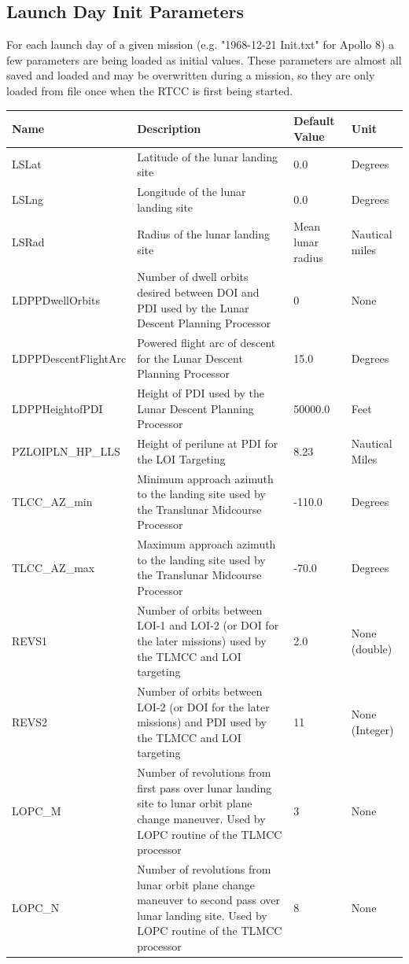 \documentclass[11pt]{article} %
\begin{document}
\newpage
\subsection{Launch Day Init Parameters}

For each launch day of a given mission (e.g. "1968-12-21 Init.txt" for Apollo 8) a few parameters are being loaded as initial values. These parameters are almost all saved and loaded and may be overwritten during a mission, so they are only loaded from file once when the RTCC is first being started.\\

\begin{tabular}{L{3.7cm} L{7cm} L{1.95cm} L{1.5cm}}
\hline
\textbf{Name} & \textbf{Description} & \textbf{Default Value} & \textbf{Unit}\\
\hline
LSLat & Latitude of the lunar landing site & 0.0 & Degrees\\
\hline
LSLng & Longitude of the lunar landing site & 0.0 & Degrees\\
\hline
LSRad & Radius of the lunar landing site & Mean lunar radius & Nautical miles\\
\hline
LDPPDwellOrbits & Number of dwell orbits desired between DOI and PDI used by the Lunar Descent Planning Processor & 0 & None\\
\hline
LDPPDescentFlightArc & Powered flight arc of descent for the Lunar Descent Planning Processor & 15.0 & Degrees\\
\hline 
LDPPHeightofPDI & Height of PDI used by the Lunar Descent Planning Processor & 50000.0 & Feet\\
\hline
PZLOIPLN\_HP\_LLS & Height of perilune at PDI for the LOI Targeting & 8.23 & Nautical Miles\\
\hline
TLCC\_AZ\_min & Minimum approach azimuth to the landing site used by the Translunar Midcourse Processor & -110.0 & Degrees\\
\hline
TLCC\_AZ\_max & Maximum approach azimuth to the landing site used by the Translunar Midcourse Processor & -70.0 & Degrees\\
\hline
REVS1 & Number of orbits between LOI-1 and LOI-2 (or DOI for the later missions) used by the TLMCC and LOI targeting & 2.0 & None (double)\\
\hline
REVS2 & Number of orbits between LOI-2 (or DOI for the later missions) and PDI used by the TLMCC and LOI targeting & 11 & None (Integer)\\
\hline
LOPC\_M & Number of revolutions from first pass over lunar landing site to lunar orbit plane change maneuver. Used by LOPC routine of the TLMCC processor & 3 & None\\
\hline
LOPC\_N & Number of revolutions from lunar orbit plane change maneuver to second pass over lunar landing site. Used by LOPC routine of the TLMCC processor & 8 & None\\
\hline
\end{tabular}
\end{document}
